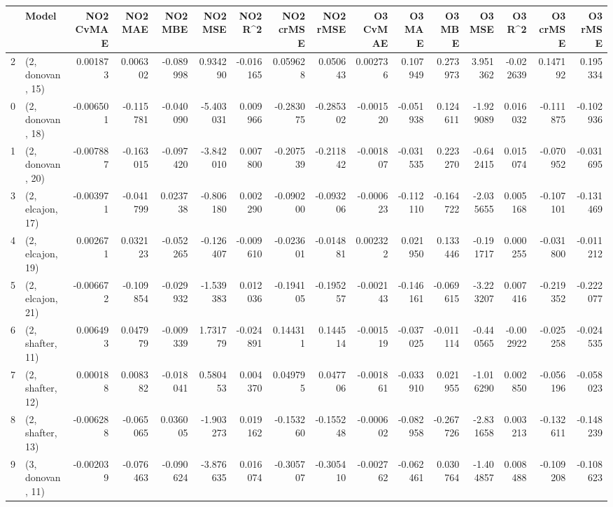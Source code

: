 \begin{tabular}{llrrrrrrrrrrrrrr}
\toprule
{} &             Model &  NO2 CvMAE &   NO2 MAE &   NO2 MBE &    NO2 MSE &   NO2 R\textasciicircum2 &  NO2 crMSE &  NO2 rMSE &  O3 CvMAE &    O3 MAE &    O3 MBE &     O3 MSE &    O3 R\textasciicircum2 &  O3 crMSE &   O3 rMSE \\
\midrule
2  &  (2, donovan, 15) &   0.001873 &  0.006302 & -0.089998 &   0.934290 & -0.016165 &   0.059628 &  0.050643 &  0.002736 &  0.107949 &  0.273973 &   3.951362 & -0.022639 &  0.147192 &  0.195334 \\
0  &  (2, donovan, 18) &  -0.006501 & -0.115781 & -0.040090 &  -5.403031 &  0.009966 &  -0.283075 & -0.285302 & -0.001520 & -0.051938 &  0.124611 &  -1.929089 &  0.016032 & -0.111875 & -0.102936 \\
1  &  (2, donovan, 20) &  -0.007887 & -0.163015 & -0.097420 &  -3.842010 &  0.007800 &  -0.207539 & -0.211842 & -0.001807 & -0.031535 &  0.223270 &  -0.642415 &  0.015074 & -0.070952 & -0.031695 \\
3  &  (2, elcajon, 17) &  -0.003971 & -0.041799 &  0.023738 &  -0.806180 &  0.002290 &  -0.090200 & -0.093206 & -0.000623 & -0.112110 & -0.164722 &  -2.035655 &  0.005168 & -0.107101 & -0.131469 \\
4  &  (2, elcajon, 19) &   0.002671 &  0.032123 & -0.052265 &  -0.126407 & -0.009610 &  -0.023601 & -0.014881 &  0.002322 &  0.021950 &  0.133446 &  -0.191717 &  0.000255 & -0.031800 & -0.011212 \\
5  &  (2, elcajon, 21) &  -0.006672 & -0.109854 & -0.029932 &  -1.539383 &  0.012036 &  -0.194105 & -0.195257 & -0.002143 & -0.146161 & -0.069615 &  -3.223207 &  0.007416 & -0.219352 & -0.222077 \\
6  &  (2, shafter, 11) &   0.006493 &  0.047979 & -0.009339 &   1.731779 & -0.024891 &   0.144311 &  0.144514 & -0.001519 & -0.037025 & -0.011114 &  -0.440565 & -0.002922 & -0.025258 & -0.024535 \\
7  &  (2, shafter, 12) &   0.000188 &  0.008382 & -0.018041 &   0.580453 &  0.004370 &   0.049795 &  0.047706 & -0.001861 & -0.033910 &  0.021955 &  -1.016290 &  0.002850 & -0.056196 & -0.058023 \\
8  &  (2, shafter, 13) &  -0.006288 & -0.065065 &  0.036005 &  -1.903273 &  0.019162 &  -0.153260 & -0.155248 & -0.000602 & -0.082958 & -0.267726 &  -2.831658 &  0.003213 & -0.132611 & -0.148239 \\
9  &  (3, donovan, 11) &  -0.002039 & -0.076463 & -0.090624 &  -3.876635 &  0.016074 &  -0.305707 & -0.305410 & -0.002762 & -0.062461 &  0.030764 &  -1.404857 &  0.008488 & -0.109208 & -0.108623 \\

\end{tabular}
